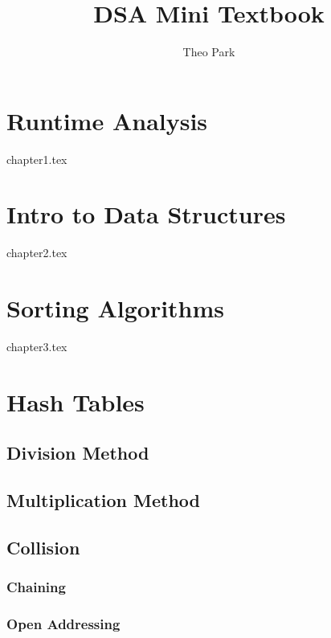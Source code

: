 \documentclass{report}
\title{DSA Mini Textbook}
\author{Theo Park}
\date{}
\begin{document}
\maketitle

\pagestyle{fancy}


\tableofcontents


\chapter{Runtime Analysis}
{chapter1.tex}


\chapter{Intro to Data Structures}
{chapter2.tex}


\chapter{Sorting Algorithms}
{chapter3.tex}


\chapter{Hash Tables}

\section{Division Method}

\section{Multiplication Method}

\section{Collision}

\subsection{Chaining}

\subsection{Open Addressing}
\end{document}
